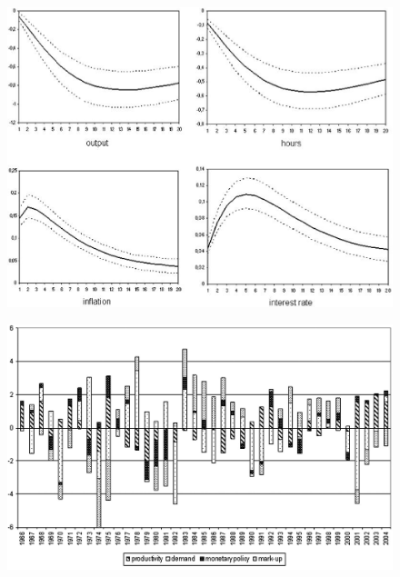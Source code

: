 \documentclass{beamer}
\begin{document}
\begin{frame}
  \begin{figure}
    \includegraphics[scale=.8]{sw_figure3.eps}
  \end{figure}
\end{frame}

\begin{frame}
  \begin{figure}
    \includegraphics[scale=.8]{sw_figure4_gdp.eps}
  \end{figure}
\end{frame}
\end{document}
